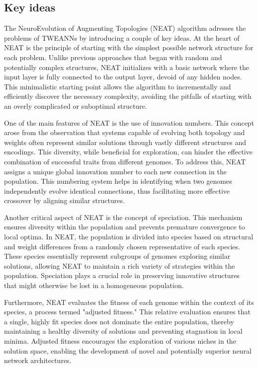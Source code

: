 \documentclass{article}
\begin{document}
\subsection{Key ideas}
The NeuroEvolution of Augmenting Topologies (NEAT) algorithm adresses the problems of TWEANNs by introducing a couple of key ideas.
At the heart of NEAT is the principle of starting with the simplest possible network structure for each problem. Unlike previous
approaches that began with random and potentially complex structures, NEAT initializes with a basic network where the input
layer is fully connected to the output layer, devoid of any hidden nodes. This minimalistic starting point allows the algorithm
to incrementally and efficiently discover the necessary complexity, avoiding the pitfalls of starting with an overly complicated 
or suboptimal structure.

One of the main features of NEAT is the use of innovation numbers. This concept arose from the observation that systems
capable of evolving both topology and weights often represent similar solutions through vastly different structures and encodings.
This diversity, while beneficial for exploration, can hinder the effective combination of successful traits from different genomes.
To address this, NEAT assigns a unique global innovation number to each new connection in the population. This numbering system helps 
in identifying when two genomes independently evolve identical connections, thus facilitating more effective crossover by
aligning similar structures. 

Another critical aspect of NEAT is the concept of speciation. This mechanism ensures diversity within the population and prevents
premature convergence to local optima. In NEAT, the population is divided into species based on structural and weight differences
from a randomly chosen representative of each species. These species essentially represent subgroups of genomes exploring similar 
solutions, allowing NEAT to maintain a rich variety of strategies within the population. Speciation plays a crucial role in preserving
innovative structures that might otherwise be lost in a homogeneous population.

Furthermore, NEAT evaluates the fitness of each genome within the context of its species, a process termed "adjusted fitness."
This relative evaluation ensures that a single, highly fit species does not dominate the entire population, thereby maintaining
a healthy diversity of solutions and preventing stagnation in local minima. Adjusted fitness encourages the exploration
of various niches in the solution space, enabling the development of novel and potentially superior neural network architectures.
\end{document}
